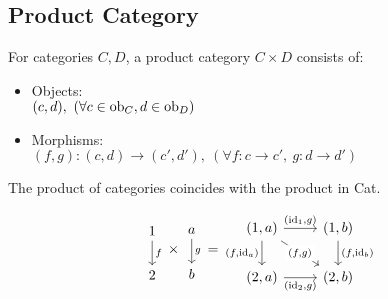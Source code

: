 \subsection{Product Category}
\begin{definition}
  For categories $C,D$, a product category $C\times D$ consists of:
  \parencite{awodey:category_theory}
  \begin{itemize}
    \item Objects:\\
      $(c, d),\ (\forall c \in \mathrm{ob}_C, d \in \mathrm{ob}_D)$
    \item Morphisms:\\
      $(f,g) : (c,d) \to (c', d'),\ (\forall f: c \to
        c',\ g:d \to d')$
  \end{itemize}
\end{definition}

\begin{remark}
  The product of categories coincides with the product in Cat.
\end{remark}

\begin{example}
  \[
    \begin{tikzcd}
      1 \\
      2
      \arrow["f", from=1-1, to=2-1]
    \end{tikzcd}
    \times
    \begin{tikzcd}
      a \\
      b
      \arrow["g", from=1-1, to=2-1]
    \end{tikzcd}
    =
    \begin{tikzcd}
      {(1,a)} & {(1,b)} \\
      {(2,a)} & {(2,b)}
      \arrow["{(\id_1,g)}", from=1-1, to=1-2]
      \arrow["{(f,\id_a)}"', from=1-1, to=2-1]
      \arrow["{(\id_2,g)}"', from=2-1, to=2-2]
      \arrow["{(f,\id_b)}", from=1-2, to=2-2]
      \arrow["{(f,g)}"{description}, from=1-1, to=2-2]
    \end{tikzcd}
  \]
\end{example}
